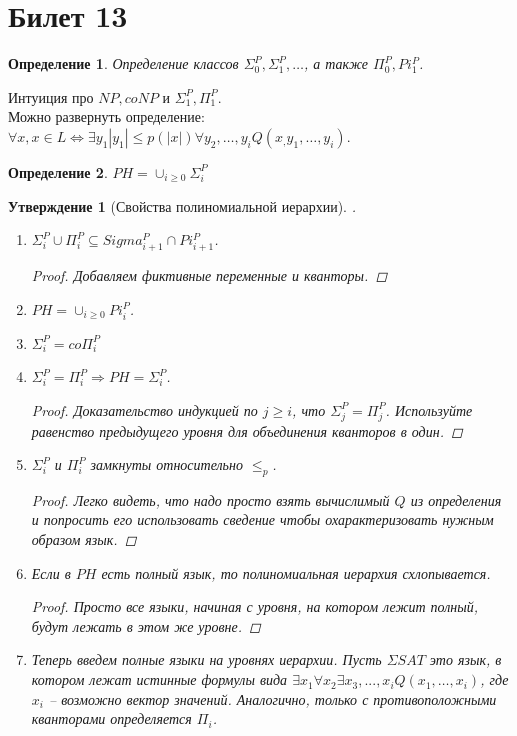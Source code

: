 \documentclass[12pt, letterpaper]{article}
\newtheorem{prop}{Утверждение}[section]
\newtheorem{defi}{Определение}[section]
\newcommand{\leqp}{\leq_{p}}
\begin{document}
\section{Билет 13}
\begin{defi}
Определение классов $\Sigma^P_0, \Sigma^P_1, \ldots$, а также $\Pi^P_0, Pi^P_1$.
\end{defi}
Интуиция про $NP, coNP$ и $\Sigma^P_1, \Pi^P_1$.\\
Можно развернуть определение:
$\forall x, x \in L \Longleftrightarrow \exists y_1 |y_1| \leq p(|x|) \forall y_2 , \ldots, y_i Q(x_, y_1, \ldots, y_i)$.
\begin{defi}
$PH = \cup_{i\geq0} \Sigma^P_i$
\end{defi}
\begin{prop}[Свойства полиномиальной иерархии].
\begin{enumerate}
\item $\Sigma^P_i \cup \Pi^P_i \subseteq Sigma^P_{i+1} \cap Pi^P_{i+1}$.
\begin{proof}
Добавляем фиктивные переменные и кванторы.
\end{proof}
\item $PH = \cup_{i\geq 0}Pi^P_i$.
\item $\Sigma^P_i = co\Pi^P_i$
\item $\Sigma^P_i = \Pi_i^P \Rightarrow PH = \Sigma^P_i$.
\begin{proof}
Доказательство индукцией по $j \geq i$, что $\Sigma^P_j = \Pi^P_j$. Используйте равенство предыдущего уровня для объединения кванторов в один.
\end{proof}
\item $\Sigma^P_i$ и $\Pi^P_i$ замкнуты относительно $\leqp$. 
\begin{proof}
Легко видеть, что надо просто взять вычислимый $Q$ из определения и попросить его использовать сведение чтобы охарактеризовать нужным образом язык. 
\end{proof}
\item
Если в $PH$ есть полный язык, то полиномиальная иерархия схлопывается. 
\begin{proof}
Просто все языки, начиная с уровня, на котором лежит полный, будут лежать в этом же уровне.
\end{proof}
\item 
Теперь введем полные языки на уровнях иерархии. Пусть $\Sigma SAT$ это язык, в котором лежат истинные формулы вида $\exists x_1 \forall x_2 \exists x_3, ..., x_i Q(x_1, \ldots, x_i)$, где $x_i$ -- возможно вектор значений. Аналогично, только с противоположными кванторами определяется $\Pi_i$. 

\end{enumerate}
\end{prop}
\end{document}
